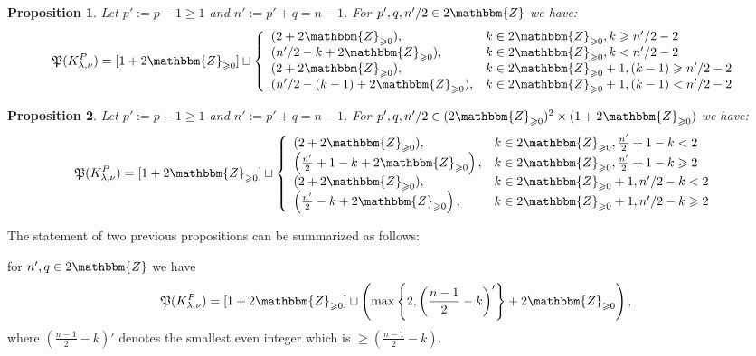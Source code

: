 \documentclass{article}
\newcommand{\assign}{:=}
\numberwithin{definition}{section}
\numberwithin{lemma}{section}
\newtheorem{proposition}{Proposition}
\numberwithin{proposition}{section}
{\theorembodyfont{\rmfamily}\newtheorem{remark}{Remark}
\numberwithin{remark}{section}
}
\begin{document}
\begin{proposition}
  \label{KP-normalization-2:prop-2}Let $p' \assign p - 1 \geqslant 1$ and $n'
  \assign p' + q = n - 1$. For $p', q, n' / 2 \in 2\mathbbm{Z}$ we have:
  \[ \mathfrak{P} ( K_{\lambda, \nu}^P) = [ 1 + 2\mathbbm{Z}_{\geqslant 0}]
     \sqcup \left\{ \begin{array}{ll}
       ( 2 + 2\mathbbm{Z}_{\geqslant 0}), & k \in 2\mathbbm{Z}_{\geqslant 0},
       k \geqslant n' / 2 - 2\\
       ( n' / 2 - k + 2\mathbbm{Z}_{\geqslant 0}), & k \in
       2\mathbbm{Z}_{\geqslant 0}, k < n' / 2 - 2\\
       ( 2 + 2\mathbbm{Z}_{\geqslant 0}), & k \in 2\mathbbm{Z}_{\geqslant 0} +
       1, ( k - 1) \geqslant n' / 2 - 2\\
       ( n' / 2 - ( k - 1) + 2\mathbbm{Z}_{\geqslant 0}), & k \in
       2\mathbbm{Z}_{\geqslant 0} + 1, ( k - 1) < n' / 2 - 2
     \end{array} \right. \]
\end{proposition}

\begin{proposition}
  \label{KP-normalization-2:prop-3}Let $p' \assign p - 1 \geqslant 1$ and $n'
  \assign p' + q = n - 1$. For $p', q, n' / 2 \in ( 2\mathbbm{Z}_{\geqslant
  0})^2 \times ( 1 + 2\mathbbm{Z}_{\geqslant 0})$ we have:
  \[ \mathfrak{P} ( K_{\lambda, \nu}^P) = [ 1 + 2\mathbbm{Z}_{\geqslant 0}]
     \sqcup \left\{ \begin{array}{ll}
       ( 2 + 2\mathbbm{Z}_{\geqslant 0}), & k \in 2\mathbbm{Z}_{\geqslant 0},
       \frac{n'}{2} + 1 - k < 2\\
       \left( \frac{n'}{2} + 1 - k + 2\mathbbm{Z}_{\geqslant 0} \right), & k
       \in 2\mathbbm{Z}_{\geqslant 0}, \frac{n'}{2} + 1 - k \geqslant 2\\
       ( 2 + 2\mathbbm{Z}_{\geqslant 0}), & k \in 2\mathbbm{Z}_{\geqslant 0} +
       1, n' / 2 - k < 2\\
       \left( \frac{n'}{2} - k + 2\mathbbm{Z}_{\geqslant 0} \right), & k \in
       2\mathbbm{Z}_{\geqslant 0} + 1, n' / 2 - k \geqslant 2
     \end{array} \right. \]
\end{proposition}

\begin{remark}
  The statement of two previous propositions can be summarized as follows:
  
  for $n', q \in 2\mathbbm{Z}$ we have
  \[ \mathfrak{P} ( K_{\lambda, \nu}^P) = [ 1 + 2\mathbbm{Z}_{\geqslant 0}]
     \sqcup \left( \max \left\{ 2, \left( \frac{n - 1}{2} - k \right)'
     \right\} + 2\mathbbm{Z}_{\geqslant 0} \right), \]
  where $\left( \frac{n - 1}{2} - k \right)'$ denotes the smallest even
  integer which is $\geqslant \left( \frac{n - 1}{2} - k \right)$.
\end{remark}
\end{document}
